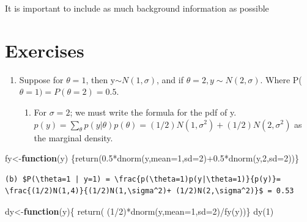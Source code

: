 \documentclass[
]{book}
\newenvironment{Shaded}{\begin{snugshade}}{\end{snugshade}}
\newcommand{\AttributeTok}[1]{\textcolor[rgb]{0.77,0.63,0.00}{#1}}
\newcommand{\ControlFlowTok}[1]{\textcolor[rgb]{0.13,0.29,0.53}{\textbf{#1}}}
\newcommand{\DecValTok}[1]{\textcolor[rgb]{0.00,0.00,0.81}{#1}}
\newcommand{\FloatTok}[1]{\textcolor[rgb]{0.00,0.00,0.81}{#1}}
\newcommand{\FunctionTok}[1]{\textcolor[rgb]{0.00,0.00,0.00}{#1}}
\newcommand{\NormalTok}[1]{#1}
\newcommand{\OtherTok}[1]{\textcolor[rgb]{0.56,0.35,0.01}{#1}}
\newcommand{\SpecialCharTok}[1]{\textcolor[rgb]{0.00,0.00,0.00}{#1}}
\providecommand{\tightlist}{%
  \setlength{\itemsep}{0pt}\setlength{\parskip}{0pt}}
\theoremstyle{definition}
\theoremstyle{definition}
\theoremstyle{definition}
\theoremstyle{definition}
\theoremstyle{remark}
\begin{document}
It is important to include as much background information as possible

\hypertarget{exercises}{%
\section{Exercises}\label{exercises}}

\begin{enumerate}
\def\labelenumi{\arabic{enumi}.}
\tightlist
\item
  Suppose for \(\theta=1\), then y\(\sim N(1,\sigma)\), and if \(\theta=2, y\sim N(2,\sigma)\). Where P(\(\theta=1)=P(\theta=2)=0.5\).

  \begin{enumerate}
  \def\labelenumii{(\alph{enumii})}
  \tightlist
  \item
    For \(\sigma=2\); we must write the formula for the pdf of y. \(p(y) = \sum_\theta p(y|\theta)p(\theta) = (1/2)N(1,\sigma^2)+ (1/2)N(2,\sigma^2)\) as the marginal density.
  \end{enumerate}
\end{enumerate}

\begin{Shaded}
\begin{Highlighting}[]
\NormalTok{ fy}\OtherTok{\textless{}{-}}\ControlFlowTok{function}\NormalTok{(y) \{}\FunctionTok{return}\NormalTok{(}\FloatTok{0.5}\SpecialCharTok{*}\FunctionTok{dnorm}\NormalTok{(y,}\AttributeTok{mean=}\DecValTok{1}\NormalTok{,}\AttributeTok{sd=}\DecValTok{2}\NormalTok{)}\SpecialCharTok{+}\FloatTok{0.5}\SpecialCharTok{*}\FunctionTok{dnorm}\NormalTok{(y,}\DecValTok{2}\NormalTok{,}\AttributeTok{sd=}\DecValTok{2}\NormalTok{))\}    }
\end{Highlighting}
\end{Shaded}

\begin{verbatim}
(b) $P(\theta=1 | y=1) = \frac{p(\theta=1)p(y|\theta=1)}{p(y)}= \frac{(1/2)N(1,4)}{(1/2)N(1,\sigma^2)+ (1/2)N(2,\sigma^2)}$ = 0.53 
\end{verbatim}

\begin{Shaded}
\begin{Highlighting}[]
\NormalTok{dy}\OtherTok{\textless{}{-}}\ControlFlowTok{function}\NormalTok{(y)\{ }\FunctionTok{return}\NormalTok{( (}\DecValTok{1}\SpecialCharTok{/}\DecValTok{2}\NormalTok{)}\SpecialCharTok{*}\FunctionTok{dnorm}\NormalTok{(y,}\AttributeTok{mean=}\DecValTok{1}\NormalTok{,}\AttributeTok{sd=}\DecValTok{2}\NormalTok{)}\SpecialCharTok{/}\FunctionTok{fy}\NormalTok{(y))\}}
\FunctionTok{dy}\NormalTok{(}\DecValTok{1}\NormalTok{)}
\end{Highlighting}
\end{Shaded}
\end{document}
